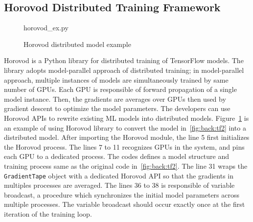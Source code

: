 \subsection{Horovod Distributed Training Framework}

\begin{figure}
 
{horovod_ex.py}
  \caption{Horovod distributed model example}
\label{fig:back:hvd} 
\end{figure}

Horovod is a Python library for distributed training of TensorFlow models.
The library adopts model-parallel approach of distributed training;
in model-parallel approach, multiple instances of models are simultaneously
trained by same number of GPUs.
Each GPU is responsible of forward propagation of a single model instance.
Then, the gradients are averages over GPUs then used by gradient descent
to optimize the model parameters. 
The developers can use Horovod APIs to rewrite existing ML models into
distributed models.
Figure~\ref{fig:back:hvd} is an example of using Horovod library to convert
the model in~\ref{fig:back:tf2} into a distributed model.
After importing the Horovod module, the line 5 first initializes the
Horovod process. 
The lines 7 to 11 recognizes GPUs in the system, and pins each GPU to
a dedicated process.
The codes defines a model structure and training process same as the original
code in~\ref{fig:back:tf2}.
The line 31 wraps the {\tt GradientTape} object with a dedicated 
Horovod API so that the gradients in multiples processes are averaged.
The lines 36 to 38 is responsible of variable broadcast, a procedure which
synchronizes the initial model parameters across multiple processes.
The variable broadcast should occur exactly once at the first iteration of
the training loop.
